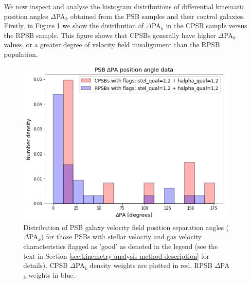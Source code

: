 We now inspect and analyse the histogram distributions of differential kinematic position angles $\Delta$PA$_{k}$ obtained from the PSB samples and their control galaxies. Firstly, in Figure \ref{fig:deltaPAdistribution} we show the distribution of $\Delta$PA$_{k}$ in the CPSB sample versus the RPSB sample. This figure shows that CPSBs generally have higher $\Delta$PA$_{k}$ values, or a greater degree of velocity field misalignment than the RPSB population. 

\begin{figure}
    \centering
    \includegraphics[width=\columnwidth]{images/JupyterPlots/Dist-Delta-PA-All-GoodFlags.png}
    \caption[Distribution of PSB stellar and gas velocity field position angles]{Distribution of PSB galaxy velocity field position separation angles ($\Delta$PA$_{k}$) for those PSBs with stellar velocity and gas velocity characteristics flagged as 'good' as denoted in the legend (see the text in Section \ref{sec:kinemetry-analysis-method-description} for details). CPSB $\Delta$PA$_{k}$ density weights are plotted in red, RPSB $\Delta$PA$_{k}$ weights in blue.}
    \label{fig:deltaPAdistribution}
\end{figure}


